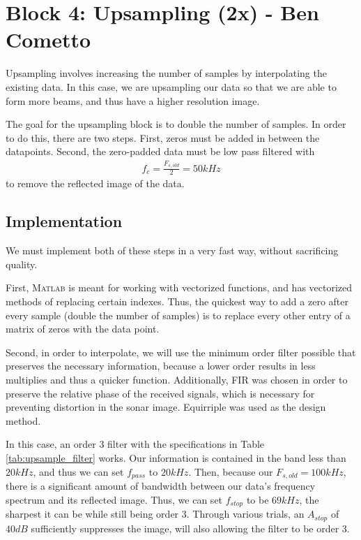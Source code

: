 
\section{Block 4: Upsampling (2x) - Ben Cometto}

Upsampling involves increasing the number of samples by interpolating the existing data.  In this case, we are upsampling our data so that we are able to form more beams, and thus have a higher resolution image.

The goal for the upsampling block is to double the number of samples.  In order to do this, there are two steps.  First, zeros must be added in between the datapoints.  Second, the zero-padded data must be low pass filtered with 
\begin{align*}
    f_c = \frac{F_{s,old}}{2} = 50 \unit{kHz}
\end{align*}
to remove the reflected image of the data.

\subsection{Implementation}

We must implement both of these steps in a very fast way, without sacrificing quality.

First, \textsc{Matlab} is meant for working with vectorized functions, and has vectorized methods of replacing certain indexes.  Thus, the quickest way to add a zero after every sample (double the number of samples) is to replace every other entry of a matrix of zeros with the data point.

Second, in order to interpolate, we will use the minimum order filter possible that preserves the necessary information, because a lower order results in less multiplies and thus a quicker function.  Additionally, FIR was chosen in order to preserve the relative phase of the received signals, which is necessary for preventing distortion in the sonar image.  Equirriple was used as the design method.

In this case, an order 3 filter with the specifications in Table \ref{tab:upsample_filter} works.  Our information is contained in the band less than $20 \unit{kHz}$, and thus we can set $f_{pass}$ to $20 \unit{kHz}$.  Then, because our $F_{s,old} = 100 \unit{kHz}$, there is a significant amount of bandwidth between our data's frequency spectrum and its reflected image.  Thus, we can set $f_{stop}$ to be $69 \unit{kHz}$, the sharpest it can be while still being order 3.  Through various trials, an $A_{stop}$ of $40 \unit{dB}$ sufficiently suppresses the image, will also allowing the filter to be order 3.

